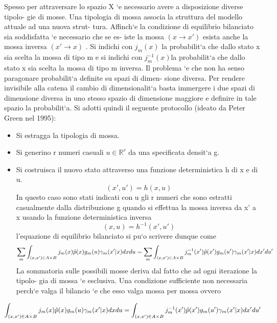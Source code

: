 Spesso per attraversare lo spazio X `e necessario avere a disposizione diverse tipolo-
gie di mosse.
Una tipologia di mossa associa la struttura del modello attuale ad una nuova strut-
tura.
Affinch`e la condizione di equilibrio bilanciato sia soddisfatta `e necessario che se es-
iste la mossa $( x \rightarrow x' )$ esista anche la mossa inversa $(x' \rightarrow x)$ .
Si indichi con $j_m (x)$ la probabilit`a che dallo stato x sia scelta la mossa di tipo m e
si indichi con $j_m^{-1}
(x ) $la probabilit`a che dallo stato x sia scelta la mossa di tipo m
inversa.
Il problema `e che non ha senso paragonare probabilit`a definite su spazi di dimen-
sione diversa.
Per rendere invisibile alla catena il cambio di dimensionalit`a basta immergere i due
spazi di dimensione diversa in uno stesso spazio di dimensione maggiore e definire
in tale spazio la probabilit`a.
Si adotti quindi il seguente protocollo (ideato da Peter Green nel 1995):
\begin{itemize}
\item Si estragga la tipologia di mossa.
\item Si generino r numeri casuali $u\in\mathbb{R}^r$ da una specificata densit`a g.
\item Si costruisca il nuovo stato attraverso una funzione deterministica h di x e di u.
\begin{equation}
(x' , u' ) = h(x, u)
\end{equation}
In questo caso sono stati indicati con u gli r numeri che sono estratti casualmente
dalla distribuzione g quando si effettua la mossa inversa da x' a x usando la funzione
deterministica inversa
\begin{equation}
(x, u) = h ^{-1}(x' , u ')
\end{equation}
l’equazione di equilibrio bilanciato si pu`o scrivere dunque come
\begin{equation*}
\sum_m \int_{(x,x')\in A\times B}j_m(x)\hat{p}(x)g_m(u)\gamma_m(x'|x)dxdu=
\sum_m \int_{(x,x')\in A\times B}j_m^{-1}(x')\hat{p}(x')g_m(u')\gamma_m(x'|x)dx'du'
\end{equation*}
La sommatoria sulle possibili mosse deriva dal fatto che ad ogni iterazione la tipolo-
gia di mossa `e esclusiva. Una condizione sufficiente non necessaria perch`e valga il
bilancio `e che esso valga mossa per mossa ovvero
\end{itemize}
\begin{equation*}
 \int_{(x,x')\in A\times B}j_m(x)\hat{p}(x)g_m(u)\gamma_m(x'|x)dxdu=
 \int_{(x,x')\in A\times B}j_m^{-1}(x')\hat{p}(x')g_m(u')\gamma_m(x'|x)dx'du'
\end{equation*}
